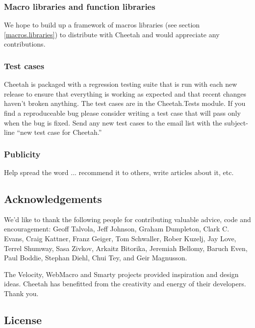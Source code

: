 \subsubsection{Macro libraries and function libraries}
We hope to build up a framework of macros libraries (see section
\ref{macros.libraries}) to distribute with Cheetah and would appreciate
any contributions.

\subsubsection{Test cases}
Cheetah is packaged with a regression testing suite that is run with each
new release to ensure that everything is working as expected and that recent
changes haven't broken anything.  The test cases are in the Cheetah.Tests
module.  If you find a reproduceable bug please consider writing a test case
that will pass only when the bug is fixed.  Send any new test cases to the email
list with the subject-line ``new test case for Cheetah.''

\subsubsection{Publicity}
Help spread the word ... recommend it to others, write articles about it, etc.

\subsection{Acknowledgements}
\label{intro.acknowledgments}
    
We'd like to thank the following people for contributing valuable advice, code
and encouragement: Geoff Talvola, Jeff Johnson, Graham Dumpleton, Clark C.
Evans, Craig Kattner, Franz Geiger, Tom Schwaller, Rober Kuzelj, Jay Love,
Terrel Shumway, Sasa Zivkov, Arkaitz Bitorika, Jeremiah Bellomy, Baruch Even,
Paul Boddie, Stephan Diehl, Chui Tey, and Geir Magnusson.
    
The Velocity, WebMacro and Smarty projects provided inspiration and design
ideas.  Cheetah has benefitted from the creativity and energy of their
developers. Thank you.

\subsection{License}
\label{intro.license}

